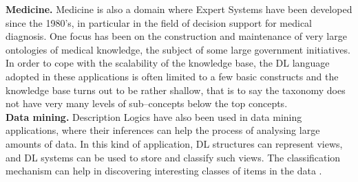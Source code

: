 \documentclass[a4paper, 11pt, oneside]{elsarticle}
\begin{document}
\textbf{Medicine.} Medicine is also a domain where Expert Systems have been developed since the 1980’s, in particular in the field of decision support for medical diagnosis. One focus has been on the construction and maintenance of very large ontologies of medical knowledge, the subject of some large government initiatives.
In order to cope with the scalability of the knowledge base, the DL language adopted in these applications is often limited to a few basic constructs and the knowledge base turns out to be rather shallow, that is to say the taxonomy does not have very many levels of sub--concepts below the top concepts.\\

\textbf{Data mining.} Description Logics have also been used in data mining applications, where their inferences can help the process of analysing large amounts of data.
In this kind of application, DL structures can represent views, and DL systems can be used to store and classify such views. The classification mechanism can help in discovering interesting classes of items in the data
\cite{Nardi:2003:IDL:885746.885748}.

\newpage
\end{document}
